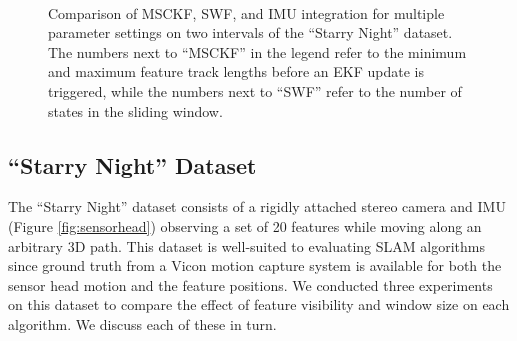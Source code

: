 \documentclass[letterpaper, 10 pt, conference]{ieeeconf}  %
\begin{document}
\begin{figure}
    \centering
    ~
    \caption{Comparison of MSCKF, SWF, and IMU integration for multiple parameter settings on two intervals of the ``Starry Night'' dataset. The numbers next to ``MSCKF'' in the legend refer to the minimum and maximum feature track lengths before an EKF update is triggered, while the numbers next to ``SWF'' refer to the number of states in the sliding window.}
\end{figure}

\subsection{``Starry Night'' Dataset}
The ``Starry Night'' dataset consists of a rigidly attached stereo camera and IMU (Figure \ref{fig:sensorhead}) observing a set of 20 features while moving along an arbitrary 3D path.
This dataset is well-suited to evaluating SLAM algorithms since ground truth from a Vicon motion capture system is available for both the sensor head motion and the feature positions.
We conducted three experiments on this dataset to compare the effect of feature visibility and window size on each algorithm.
We discuss each of these in turn.
\end{document}
